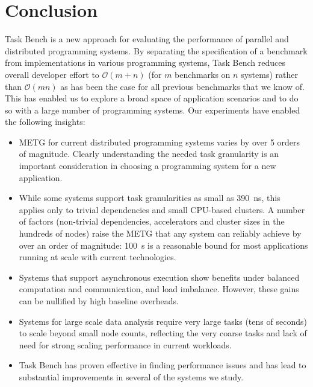 \section{Conclusion}
\label{sec:conclusion}

Task Bench is a new approach for evaluating the performance of
parallel and distributed programming systems. By separating the
specification of a benchmark from implementations in various
programming systems, Task Bench reduces overall developer effort to
$\mathcal{O}(m + n)$ (for $m$ benchmarks on $n$ systems) rather than
$\mathcal{O}(mn)$ as has been the case for all previous
benchmarks that we know of. This has enabled us to explore a broad space of
application scenarios and to do so with a large number of programming
systems. Our experiments have enabled the following
insights:

\begin{itemize}

\item METG for current distributed programming systems varies by over
  5 orders of magnitude.  Clearly understanding the needed task
  granularity is an important consideration in choosing a programming
  system for a new application.

\item While some systems support task granularities as small as 390~ns, this applies only to trivial dependencies and small CPU-based clusters. A number of factors (non-trivial dependencies, accelerators and cluster sizes in the hundreds of nodes) raise the
  METG that any system can reliably achieve by over an order of magnitude: 100~\textmu{}s is a reasonable bound for most applications running at scale with current technologies.

\item Systems that support asynchronous execution show benefits under
  balanced computation
  and communication, and load imbalance. However, these gains can be nullified by
  high baseline overheads.

\item Systems for large scale data analysis require very large tasks
  (tens of seconds) to scale beyond small node counts,
  reflecting the very coarse tasks and lack of need for strong scaling
  performance in current workloads.

\item Task Bench has proven effective in finding performance issues
  and has lead to substantial improvements in several of the systems
  we study.

\end{itemize}

